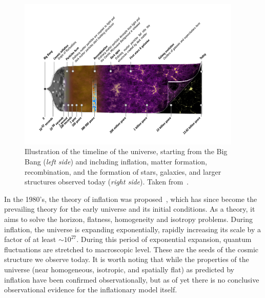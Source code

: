 \begin{figure}[ht]
	\centering
	\includegraphics[width=0.95\textwidth]{fig/history_universe_inverted.png}
	\caption{Illustration of the timeline of the universe, starting from the Big Bang (\emph{left side}) and including inflation, matter formation, recombination, and the formation of stars, galaxies, and larger structures observed today (\emph{right side}). Taken from~\cite{ESA:2013tl}.}
	\label{fig:timelineuniverse}
\end{figure}
In the 1980's, the theory of inflation was proposed~\cite{Guth:1980zm,Linde:1981mu,Albrecht:1982wi}, which has since become the prevailing theory for the early universe and its initial conditions. As a theory, it aims to solve the horizon, flatness, homogeneity and isotropy problems. During inflation, the universe is expanding exponentially, rapidly increasing its scale by a factor of at least $\sim 10^{27}$. During this period of exponential expansion, quantum fluctuations are stretched to macroscopic level. These are the seeds of the cosmic structure we observe today. It is worth noting that while the properties of the universe (near homogeneous, isotropic, and spatially flat) as predicted by inflation have been confirmed observationally, but as of yet there is no conclusive observational evidence for the inflationary model itself. 

